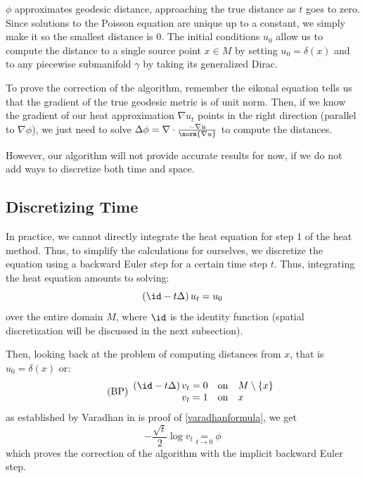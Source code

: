 \documentclass[math, info, english]{cours}
\begin{document}
$\phi$ approximates geodesic distance, approaching the true distance as $t$ goes to zero.
Since solutions to the Poisson equation are unique up to a constant, we simply make it so the smallest distance is $0$.
The initial conditions $u_{0}$ allow us to compute the distance to a single source point $x \in M$ by setting $u_{0} = \delta(x)$ and to any piecewise submanifold $\gamma$ by taking its generalized Dirac.


To prove the correction of the algorithm, remember the eikonal equation tells us that the gradient of the true geodesic metric is of unit norm.
Then, if we know the gradient of our heat approximation $\nabla u_{t}$ points in the right direction (parallel to $\nabla\phi$), we just need to solve $\Delta \phi = \nabla \cdot \frac{-\nabla u}{\norm{\nabla u}}$ to compute the distances.

However, our algorithm will not provide accurate results for now, if we do not add ways to discretize both time and space.

\subsection{Discretizing Time}
In practice, we cannot directly integrate the heat equation for step 1 of the heat method.
Thus, to simplify the calculations for ourselves, we discretize the equation using a backward Euler step for a certain time step $t$.
Thus, integrating the heat equation amounts to solving:
\begin{equation}
	\left( \id - t\Delta \right)u_{t} = u_{0}
\end{equation}
over the entire domain $M$, where $\id$ is the identity function (spatial discretization will be discussed in the next subsection).

Then, looking back at the problem of computing distances from $x$, that is $u_{0} = \delta(x)$ or:
\begin{equation}
	\tag{BP}
	\begin{array}{rcl}
		\left( \id - t\Delta \right)v_{t} = 0 & \rm on & M\setminus \{x\}\\
		v_{t} = 1 & \rm on & x
	\end{array}
	\label{boundaryproblem}
\end{equation}
as established by Varadhan in is proof of \ref{varadhanformula}, we get
\begin{equation}
	\tag{$\delta t$}
	-\frac{\sqrt{t}}{2}\log v_{t} \underset{t \to 0}{=} \phi
	\label{discretetime}
\end{equation}
which proves the correction of the algorithm with the implicit backward Euler step.
\end{document}
